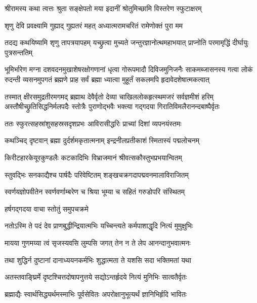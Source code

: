 \twolineshloka
{श्रीरामस्य कथा त्वत्तः श्रुता सङ्क्षेपतो मया}
{इदानीं श्रोतुमिच्छामि विस्तरेण स्फुटाक्षरम्} %


\twolineshloka
{शृणु देवि प्रवक्ष्यामि गुह्याद् गुह्यतरं महत्}
{अध्यात्मरामचरितं रामेणोक्तं पुरा मम} %

\threelineshloka
{तदद्य कथयिष्यामि शृणु तापत्रयापहम्}
{यच्छ्रुत्वा मुच्यते जन्तुरज्ञानोत्थमहाभयात्}
{प्राप्नोति परमामृद्धिं दीर्घायुः पुत्रसन्ततिम्} %

\fourlineindentedshloka
{भूमिर्भारेण मग्ना दशवदनमुखाशेषरक्षोगणानां}
{धृत्वा गोरूपमादौ दिविजमुनिजनैः साकमब्जासनस्य}
{गत्वा लोकं रुदन्ती व्यसनमुपगतं ब्रह्मणे प्राह सर्वं}
{ब्रह्मा ध्यात्वा मुहूर्तं सकलमपि हृदावेदशेषात्मकत्वात्} %

\fourlineindentedshloka
{तस्मात् क्षीरसमुद्रतीरमगमद् ब्रह्माथ देवैर्वृतो}
{देव्या चाखिललोकहृत्स्थमजरं सर्वज्ञमीशं हरिम्}
{अस्तौषीच्छ्रुतिसिद्धनिर्मलपदैः स्तोत्रैः पुराणोद्भवैः}
{भक्त्या गद्गदया गिरातिविमलैरानन्दबाष्पैर्वृतः} %

\twolineshloka
{ततः स्फुरत्सहस्रांशुसहस्रसदृशप्रभः}
{आविरासीद्धरिः प्राच्यां दिशां व्यपनयंस्तमः} %

\twolineshloka
{कथञ्चिद् दृष्टवान् ब्रह्मा दुर्दर्शमकृतात्मनाम्}
{इन्द्रनीलप्रतीकाशं स्मितास्यं पद्मलोचनम्} %

\twolineshloka
{किरीटहारकेयूरकुण्डलैः कटकादिभिः}
{विभ्राजमानं श्रीवत्सकौस्तुभप्रभयान्वितम्} %

\twolineshloka
{स्तुवद्भिः सनकाद्यैश्च पार्षदैः परिवेष्टितम्}
{शङ्खचक्रगदापद्मवनमालाविराजितम्} %

\twolineshloka
{स्वर्णयज्ञोपवीतेन स्वर्णवर्णाम्बरेण च}
{श्रिया भूम्या च सहितं गरुडोपरि संस्थितम्} %

\onelineshloka
{हर्षगद्गदया वाचा स्तोतुं समुपचक्रमे} %


\twolineshloka
{नतोऽस्मि ते पदं देव प्राणबुद्धीन्द्रियात्मभिः}
{यच्चिन्त्यते कर्मपाशाद्धृदि नित्यं मुमुक्षुभिः} %

\twolineshloka
{मायया गुणमय्या त्वं सृजस्यवसि लुम्पसि}
{जगत् तेन न ते लेप आनन्दानुभवात्मनः} %

\twolineshloka
{तथा शुद्धिर्न दुष्टानां दानाध्ययनकर्मभिः}
{शुद्धात्मता ते यशसि सदा भक्तिमतां यथा} %

\twolineshloka
{अतस्तवाङ्घ्रिर्मे दृष्टश्चित्तदोषापनुत्तये}
{सद्योऽन्तर्हृदये नित्यं मुनिभिः सात्वतैर्वृतः} %

\twolineshloka
{ब्रह्माद्यैः स्वार्थसिद्ध्यर्थमस्माभिः पूर्वसेवितः}
{अपरोक्षानुभूत्यर्थं ज्ञानिभिर्हृदि भावितः} %

